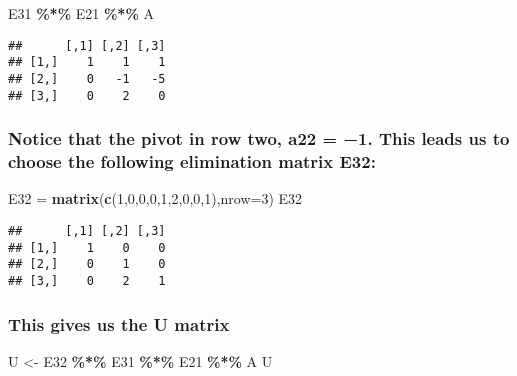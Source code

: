 \documentclass[
]{article}
\newenvironment{Shaded}{\begin{snugshade}}{\end{snugshade}}
\newcommand{\AttributeTok}[1]{\textcolor[rgb]{0.13,0.29,0.53}{#1}}
\newcommand{\DecValTok}[1]{\textcolor[rgb]{0.00,0.00,0.81}{#1}}
\newcommand{\FunctionTok}[1]{\textcolor[rgb]{0.13,0.29,0.53}{\textbf{#1}}}
\newcommand{\NormalTok}[1]{#1}
\newcommand{\OtherTok}[1]{\textcolor[rgb]{0.56,0.35,0.01}{#1}}
\newcommand{\SpecialCharTok}[1]{\textcolor[rgb]{0.81,0.36,0.00}{\textbf{#1}}}
\begin{document}
\begin{Shaded}
\begin{Highlighting}[]
\NormalTok{E31 }\SpecialCharTok{\%*\%}\NormalTok{ E21 }\SpecialCharTok{\%*\%}\NormalTok{ A}
\end{Highlighting}
\end{Shaded}

\begin{verbatim}
##      [,1] [,2] [,3]
## [1,]    1    1    1
## [2,]    0   -1   -5
## [3,]    0    2    0
\end{verbatim}

\hypertarget{notice-that-the-pivot-in-row-two-a22-1.-this-leads-us-to-choose-the-following-elimination-matrix-e32}{%
\subsubsection{Notice that the pivot in row two, a22 = −1. This leads us
to choose the following elimination matrix
E32:}\label{notice-that-the-pivot-in-row-two-a22-1.-this-leads-us-to-choose-the-following-elimination-matrix-e32}}

\begin{Shaded}
\begin{Highlighting}[]
\NormalTok{E32 }\OtherTok{=} \FunctionTok{matrix}\NormalTok{(}\FunctionTok{c}\NormalTok{(}\DecValTok{1}\NormalTok{,}\DecValTok{0}\NormalTok{,}\DecValTok{0}\NormalTok{,}\DecValTok{0}\NormalTok{,}\DecValTok{1}\NormalTok{,}\DecValTok{2}\NormalTok{,}\DecValTok{0}\NormalTok{,}\DecValTok{0}\NormalTok{,}\DecValTok{1}\NormalTok{),}\AttributeTok{nrow=}\DecValTok{3}\NormalTok{)}
\NormalTok{E32}
\end{Highlighting}
\end{Shaded}

\begin{verbatim}
##      [,1] [,2] [,3]
## [1,]    1    0    0
## [2,]    0    1    0
## [3,]    0    2    1
\end{verbatim}

\hypertarget{this-gives-us-the-u-matrix}{%
\subsubsection{This gives us the U
matrix}\label{this-gives-us-the-u-matrix}}

\begin{Shaded}
\begin{Highlighting}[]
\NormalTok{U }\OtherTok{\textless{}{-}}\NormalTok{ E32 }\SpecialCharTok{\%*\%}\NormalTok{ E31 }\SpecialCharTok{\%*\%}\NormalTok{ E21 }\SpecialCharTok{\%*\%}\NormalTok{ A}
\NormalTok{U}
\end{Highlighting}
\end{Shaded}
\end{document}
